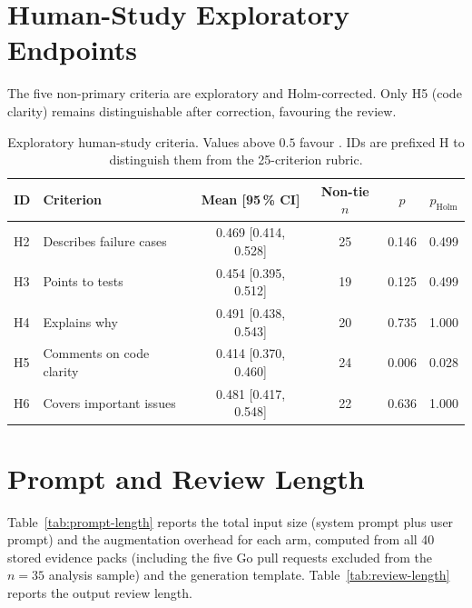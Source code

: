 

\section{Human-Study Exploratory Endpoints}
\label{app:supporting-human}

The five non-primary criteria are exploratory and Holm-corrected. Only H5
(code clarity) remains distinguishable after correction, favouring the
\baseline{} review.

\begin{table}[htbp]
    \centering
    \caption{Exploratory human-study criteria. Values above $0.5$ favour
             \kg{}. IDs are prefixed H to distinguish them from the
             25-criterion rubric.}
    \label{tab:human-exploratory}
    \small
    \begin{tabular}{llcccc}
        \toprule
        ID & Criterion & Mean [95\,\% CI] & Non-tie $n$ & $p$ & $p_{\text{Holm}}$ \\
        \midrule
        H2 & Describes failure cases     & 0.469 [0.414, 0.528] & 25 & 0.146 & 0.499 \\
        H3 & Points to tests             & 0.454 [0.395, 0.512] & 19 & 0.125 & 0.499 \\
        H4 & Explains why                & 0.491 [0.438, 0.543] & 20 & 0.735 & 1.000 \\
        H5 & Comments on code clarity    & 0.414 [0.370, 0.460] & 24 & 0.006 & 0.028 \\
        H6 & Covers important issues     & 0.481 [0.417, 0.548] & 22 & 0.636 & 1.000 \\
        \bottomrule
    \end{tabular}
\end{table}

\section{Prompt and Review Length}
\label{app:supporting-length}

Table~\ref{tab:prompt-length} reports the total input size (system prompt
plus user prompt) and the augmentation overhead for each arm, computed
from all 40 stored evidence packs (including the five Go pull requests
excluded from the $n = 35$ analysis sample) and the generation template.
Table~\ref{tab:review-length} reports the output review length.

